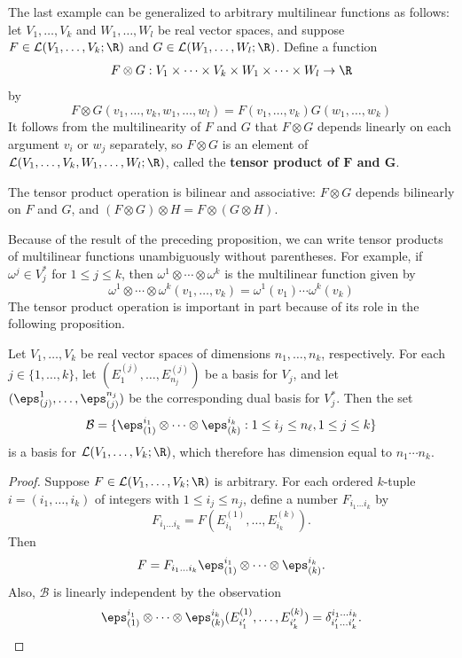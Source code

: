 The last example can be generalized to arbitrary multilinear functions as follows: let $V_1,\dots,V_k$ and $W_1,\dots,W_l$ be real vector spaces, and suppose $F\in\mathcal{L}(V_1,\dots,V_k;\R)$ and $G\in\mathcal{L}(W_1,\dots,W_l;\R)$. Define a function
\[F\otimes G:V_1\times\cdots\times V_k\times W_1\times\cdots\times W_l\to\R\]
by
\[F\otimes G(v_1,\dots,v_k,w_1,\dots,w_l)=F(v_1,\dots,v_k)G(w_1,\dots,w_k)\]
It follows from the multilinearity of $F$ and $G$ that $F\otimes G$ depends linearly on each argument $v_i$ or $w_j$ separately, so $F\otimes G$ is an element of $\mathcal{L}(V_1,\dots,V_k,W_1,\dots,W_l;\R)$, called the \textbf{tensor product of $\bm{F}$ and $\bm{G}$}.
\begin{proposition}
The tensor product operation is bilinear and associative: $F\otimes G$ depends bilinearly on $F$ and $G$, and $(F\otimes G)\otimes H=F\otimes(G\otimes H)$.
\end{proposition}
Because of the result of the preceding proposition, we can write tensor products
of multilinear functions unambiguously without parentheses. For example, if $\omega^j\in V_j^*$ for $1\leq j\leq k$, then $\omega^1\otimes\cdots\otimes\omega^k$ is the multilinear function given by
\[\omega^1\otimes\cdots\otimes\omega^k(v_1,\dots,v_k)=\omega^1(v_1)\cdots\omega^k(v_k)\]
The tensor product operation is important in part because of its role in the following proposition.
\begin{proposition}
Let $V_1,\dots,V_k$ be real vector spaces of dimensions $n_1,\dots,n_k$, respectively. For each $j\in\{1,\dots,k\}$, let $(E^{(j)}_1,\dots,E^{(j)}_{n_j})$ be a basis for $V_j$, and let $(\eps_{(j)}^1,\dots,\eps_{(j)}^{n_j})$ be the corresponding dual basis for $V_j^*$. Then the set
\[\mathcal{B}=\{\eps^{i_1}_{(1)}\otimes\cdots\otimes\eps^{i_k}_{(k)}:1\leq i_j\leq n_\ell,1\leq j\leq k\}\]
is a basis for $\mathcal{L}(V_1,\dots,V_k;\R)$, which therefore has dimension equal to $n_1\cdots n_k$.
\end{proposition}
\begin{proof}
Suppose $F\in\mathcal{L}(V_1,\dots,V_k;\R)$ is arbitrary. For each ordered $k$-tuple $i=(i_1,\dots,i_k)$ of integers with $1\leq i_j\leq n_j$, define a number $F_{i_1\dots i_k}$ by 
\[F_{i_1\dots i_k}=F(E^{(1)}_{i_1},\dots,E^{(k)}_{i_k}).\]
Then
\[F=F_{i_1\dots i_k}\eps^{i_1}_{(1)}\otimes\cdots\otimes\eps^{i_k}_{(k)}.\]
Also, $\mathcal{B}$ is linearly independent by the observation
\[\eps^{i_1}_{(1)}\otimes\cdots\otimes\eps^{i_k}_{(k)}(E^{(1)}_{i'_1},\dots,E^{(k)}_{i'_k})=\delta^{i_1\dots i_k}_{i'_1\dots i'_k}.\]
\end{proof}

